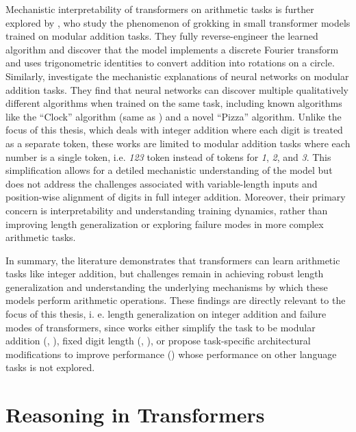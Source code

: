 Mechanistic interpretability of transformers on arithmetic tasks is further explored by \cite{nanda_progress_2022}, who study the phenomenon of grokking in small transformer models trained on modular addition tasks. They fully reverse-engineer the learned algorithm and discover that the model implements a discrete Fourier transform and uses trigonometric identities to convert addition into rotations on a circle. Similarly, \cite{zhong_clock_2023} investigate the mechanistic explanations of neural networks on modular addition tasks. They find that neural networks can discover multiple qualitatively different algorithms when trained on the same task, including known algorithms like the ``Clock'' algorithm (same as \cite{nanda_progress_2022}) and a novel ``Pizza'' algorithm. Unlike the focus of this thesis, which deals with integer addition where each digit is treated as a separate token, these works are limited to modular addition tasks where each number is a single token, i.e. \emph{123} token instead of tokens for \emph{1}, \emph{2}, and \emph{3}. This simplification allows for a detiled mechanistic understanding of the model but does not address the challenges associated with variable-length inputs and position-wise alignment of digits in full integer addition. Moreover, their primary concern is interpretability and understanding training dynamics, rather than improving length generalization or exploring failure modes in more complex arithmetic tasks.

In summary, the literature demonstrates that transformers can learn arithmetic tasks like integer addition, but challenges remain in achieving robust length generalization and understanding the underlying mechanisms by which these models perform arithmetic operations. These findings are directly relevant to the focus of this thesis, i. e. length generalization on integer addition and failure modes of transformers, since works either simplify the task to be modular addition (\parencite{nanda_progress_2022}, \parencite{zhong_clock_2023}), fixed digit length (\parencite{lee_teaching_2023}, \parencite{quirke_understanding_2023}), or propose task-specific architectural modifications to improve performance (\parencite{mcleish_transformers_2024}) whose performance on other language tasks is not explored.

\section{Reasoning in Transformers}\label{sec:sota_reasoning_in_transformers}

